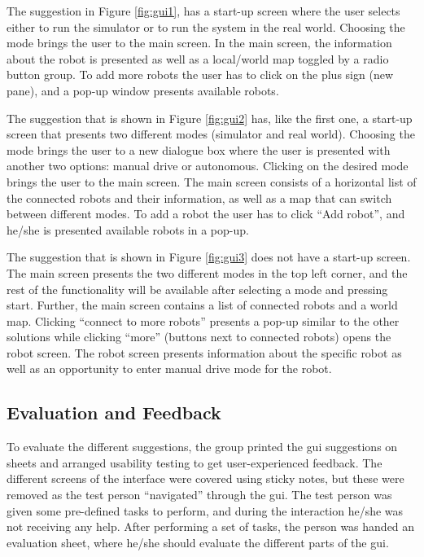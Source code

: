The suggestion in Figure \ref{fig:gui1}, has a start-up screen where the user selects either to run the simulator or to run the system in the real world. Choosing the mode brings the user to the main screen. In the main screen, the information about the robot is presented as well as a local/world map toggled by a radio button group. To add more robots the user has to click on the plus sign (new pane), and a pop-up window presents available robots.

The suggestion that is shown in Figure \ref{fig:gui2} has, like the first one, a start-up screen that presents two different modes (simulator and real world). Choosing the mode brings the user to a new dialogue box where the user is presented with another two options: manual drive or autonomous. Clicking on the desired mode brings the user to the main screen. The main screen consists of a horizontal list of the connected robots and their information, as well as a map that can switch between different modes. To add a robot the user has to click ``Add robot'', and he/she is presented available robots in a pop-up.

The suggestion that is shown in Figure \ref{fig:gui3} does not have a start-up screen. The main screen presents the two different modes in the top left corner, and the rest of the functionality will be available after selecting a mode and pressing start. Further, the main screen contains a list of connected robots and a world map. Clicking ``connect to more robots'' presents a pop-up similar to the other solutions while clicking ``more'' (buttons next to connected robots) opens the robot screen. The robot screen presents information about the specific robot as well as an opportunity to enter manual drive mode for the robot.

\subsection{Evaluation and Feedback}
\label{sec:evalandfeedback}
To evaluate the different suggestions, the group printed the \acrshort{gui} suggestions on sheets and arranged usability testing to get user-experienced feedback. The different screens of the interface were covered using sticky notes, but these were removed as the test person ``navigated'' through the \acrshort{gui}. The test person was given some pre-defined tasks to perform, and during the interaction he/she was not receiving any help. After performing a set of tasks, the person was handed an evaluation sheet, where he/she should evaluate the different parts of the \acrshort{gui}.

